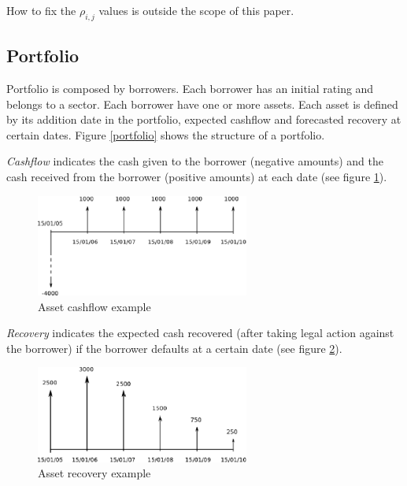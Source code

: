 \documentclass[a4paper,12pt,final]{article}
\begin{document}
How to fix the $\rho_{i,j}$ values is outside the scope of this paper.

\subsection{Portfolio}
Portfolio is composed by borrowers. Each borrower has an initial rating and 
belongs to a sector. Each borrower have one or more assets. Each asset
is defined by its addition date in the portfolio, expected cashflow and 
forecasted recovery at certain dates. Figure \ref{portfolio} shows the 
structure of a portfolio.
\newline

\emph{Cashflow} indicates the cash given to the borrower (negative amounts) and the
cash received from the borrower (positive amounts) at each date (see figure \ref{cashflow}).

\begin{figure}[!hbt]
\begin{center}
\includegraphics[width=7cm, angle=0]{./images/cashflow.eps}
\caption{Asset cashflow example}
\label{cashflow}
\end{center}
\end{figure}
\FloatBarrier

\emph{Recovery} indicates the expected cash recovered (after taking legal action against 
the borrower) if the borrower defaults at a certain date (see figure \ref{recovery}).

\begin{figure}[!hbt]
\begin{center}
\includegraphics[width=7cm, angle=0]{./images/recovery.eps}
\caption{Asset recovery example}
\label{recovery}
\end{center}
\end{figure}
\FloatBarrier
\end{document}
